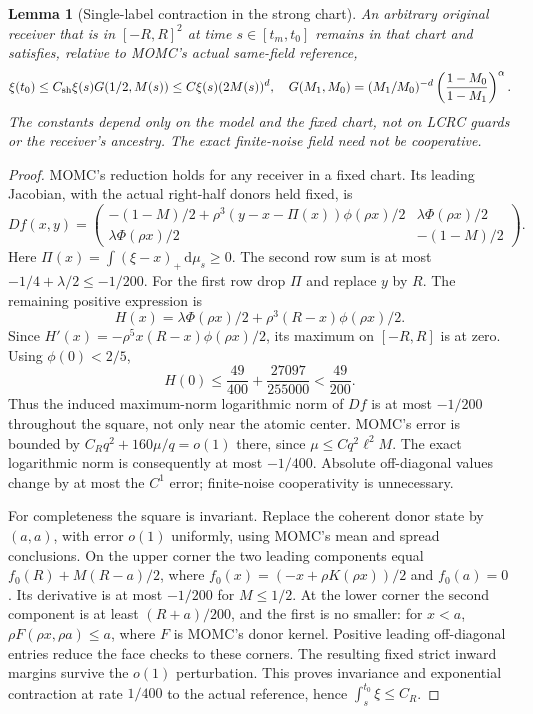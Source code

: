 \documentclass[11pt]{article}
\newtheorem{lemma}[theorem]{Lemma}
\theoremstyle{remark}\newtheorem{remark}[theorem]{Remark}
\newcommand{\dd}{\,\mathrm d}
\begin{document}
\begin{lemma}[Single-label contraction in the strong chart]
\label{an03lsbv1:chart}
An arbitrary original receiver that is in $[-R,R]^2$ at time
$s\in[t_m,t_0]$ remains in that chart and satisfies, relative to
MOMC's actual same-field reference,
\begin{equation}
 \xi(t_0)\le C_{\rm sh}\xi(s)G(1/2,M(s))
       \le C\xi(s)(2M(s))^d,
 \quad
 G(M_1,M_0)=(M_1/M_0)^{-d}
       \left(\frac{1-M_0}{1-M_1}\right)^\alpha.
 \label{an03lsbv1:single}
\end{equation}
The constants depend only on the model and the fixed chart, not on
LCRC guards or the receiver's ancestry. The exact finite-noise field
need not be cooperative.
\end{lemma}
\begin{proof}
MOMC's reduction holds for any receiver in a fixed chart. Its leading
Jacobian, with the actual right-half donors held fixed, is
\[
 Df(x,y)=\begin{pmatrix}
 -(1-M)/2+\rho^3(y-x-\Pi(x))\phi(\rho x)/2&\lambda\Phi(\rho x)/2\\
 \lambda\Phi(\rho x)/2&-(1-M)/2
 \end{pmatrix}.
\]
Here $\Pi(x)=\int(\xi-x)_+\dd\mu_s\ge0$.
The second row sum is at most $-1/4+\lambda/2\le-1/200$.
For the first row drop $\Pi$ and replace $y$ by $R$. The remaining
positive expression is
\[
 H(x)=\lambda\Phi(\rho x)/2+\rho^3(R-x)\phi(\rho x)/2.
\]
Since $H'(x)=-\rho^5x(R-x)\phi(\rho x)/2$, its maximum on
$[-R,R]$ is at zero. Using $\phi(0)<2/5$,
\[
 H(0)\le\frac{49}{400}+\frac{27097}{255000}
        <\frac{49}{200}.
\]
Thus the induced maximum-norm logarithmic norm of $Df$ is at most
$-1/200$ throughout the square, not only near the atomic center.
MOMC's error is bounded by $C_Rq^2+160\mu/q=o(1)$ there,
since $\mu\le Cq^2\ell^2M$. The exact logarithmic norm is consequently
at most $-1/400$. Absolute off-diagonal values change by at most the
$C^1$ error; finite-noise cooperativity is unnecessary.

For completeness the square is invariant. Replace the coherent donor
state by $(a,a)$, with error $o(1)$ uniformly, using MOMC's mean and
spread conclusions. On the upper corner the two leading components
equal $f_0(R)+M(R-a)/2$, where
$f_0(x)=(-x+\rho K(\rho x))/2$ and $f_0(a)=0$.
Its derivative is at most $-1/200$ for $M\le1/2$.
At the lower corner the second component is at least
$(R+a)/200$, and the first is no smaller: for $x<a$,
$\rho F(\rho x,\rho a)\le a$, where $F$ is MOMC's donor kernel.
Positive leading off-diagonal entries reduce the face checks to
these corners. The resulting fixed strict inward margins survive
the $o(1)$ perturbation. This proves invariance and exponential
contraction at rate $1/400$ to the actual reference, hence
$\int_s^{t_0}\xi\le C_R$.


\end{proof}
\end{document}

